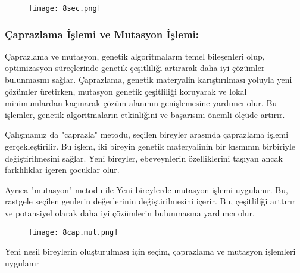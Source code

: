 \documentclass[12pt, a4paper]{article}
\begin{document}
\begin{flushleft}
\begin{figure}[!h]
	\centering
	\texttt{[image: 8sec.png]}
	
\end{figure}



\subsubsection{Çaprazlama İşlemi ve Mutasyon İşlemi: }
\item Çaprazlama ve mutasyon, genetik algoritmaların temel bileşenleri olup, optimizasyon süreçlerinde genetik çeşitliliği artırarak daha iyi çözümler bulunmasını sağlar. Çaprazlama, genetik materyalin karıştırılması yoluyla yeni çözümler üretirken, mutasyon genetik çeşitliliği koruyarak ve lokal minimumlardan kaçınarak çözüm alanının genişlemesine yardımcı olur. Bu işlemler, genetik algoritmaların etkinliğini ve başarısını önemli ölçüde artırır.
\item Çalışmamız da "caprazla" metodu, seçilen bireyler arasında çaprazlama işlemi gerçekleştirilir. Bu işlem, iki bireyin genetik materyalinin bir kısmının birbiriyle değiştirilmesini sağlar. Yeni bireyler, ebeveynlerin özelliklerini taşıyan ancak farklılıklar içeren çocuklar olur.\\[10pt]
\item Ayrıca "mutasyon" metodu ile  Yeni bireylerde mutasyon işlemi uygulanır. Bu, rastgele seçilen genlerin değerlerinin değiştirilmesini içerir. Bu, çeşitliliği arttırır ve potansiyel olarak daha iyi çözümlerin bulunmasına yardımcı olur.\\[10pt]


\begin{figure}[!h]
	\centering
	\texttt{[image: 8cap.mut.png]}
	\\[20pt]
\end{figure}

\item	Yeni nesil bireylerin oluşturulması için seçim, çaprazlama ve mutasyon işlemleri uygulanır	

\newpage



\end{flushleft}
\end{document}
